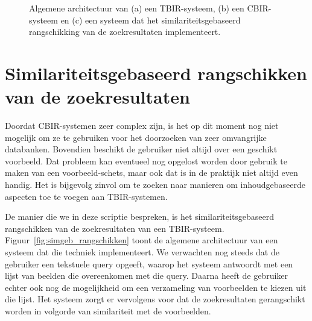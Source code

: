 \begin{figure}[!b]
\vspace{10pt}
\centering
{}
\vspace{5pt}
\vspace{5pt}
\caption{\label{fig:cbir_en_tbir}Algemene architectuur van (a) een TBIR-systeem, 
(b) een CBIR-systeem en (c) een systeem dat het similariteitsgebaseerd rangschikking
van de zoekresultaten implementeert.}
\end{figure}

\section{Similariteitsgebaseerd rangschikken van de zoekresultaten}

Doordat CBIR-systemen zeer complex zijn, is het op dit moment nog niet mogelijk om ze te gebruiken voor het 
doorzoeken van zeer omvangrijke databanken. Bovendien beschikt de gebruiker niet altijd over
een geschikt voorbeeld. Dat probleem kan eventueel nog opgelost worden door gebruik
te maken van een voorbeeld-schets, maar ook dat is in de praktijk niet altijd even handig.
Het is bijgevolg zinvol om te zoeken naar manieren om inhoudgebaseerde aspecten toe te voegen aan
TBIR-systemen. 

De manier die we in deze scriptie bespreken, is het 
similariteitsgebaseerd rangschikken van de zoekresultaten van een TBIR-systeem. 
Figuur~\ref{fig:simgeb_rangschikken} toont de algemene architectuur van een systeem
dat die techniek implementeert. We verwachten
nog steeds dat de gebruiker een tekstuele query opgeeft, waarop het systeem antwoordt met een 
lijst van beelden die overeenkomen met die query. Daarna heeft de gebruiker echter ook nog 
de mogelijkheid om een verzameling van voorbeelden te kiezen uit die lijst. Het 
systeem zorgt er vervolgens voor dat de zoekresultaten gerangschikt worden in 
volgorde van similariteit met de voorbeelden.

